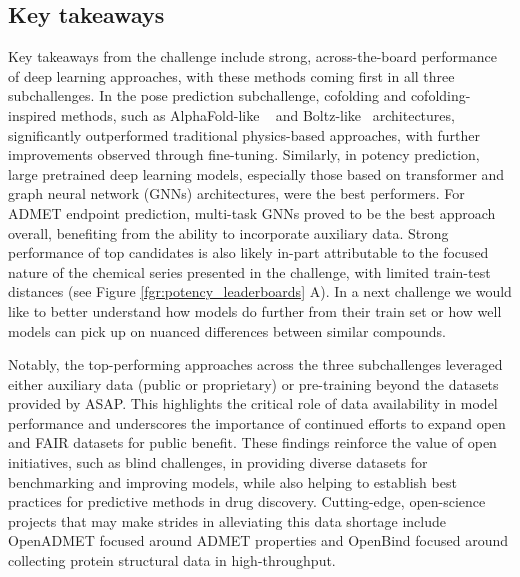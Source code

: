 \documentclass[journal=jcim,manuscript=article]{achemso}
\begin{document}
\subsection{Key takeaways}

Key takeaways from the challenge include strong, across-the-board performance of deep learning approaches, with these methods coming first in all three subchallenges. In the pose prediction subchallenge, cofolding and cofolding-inspired methods, such as AlphaFold-like ~\cite{abramson_2024_alphafold} and Boltz-like~\cite{wohlwend_2024_boltz-1, passaro_2025_boltz-2} architectures, significantly outperformed traditional physics-based approaches, with further improvements observed through fine-tuning. Similarly, in potency prediction, large pretrained deep learning models, especially those based on transformer and graph neural network (GNNs) architectures, were the best performers. For ADMET endpoint prediction, multi-task GNNs proved to be the best approach overall, benefiting from the ability to incorporate auxiliary data. Strong performance of top candidates is also likely in-part attributable to the focused nature of the chemical series presented in the challenge, with limited train-test distances (see Figure \ref{fgr:potency_leaderboards} A). In a next challenge we would like to better understand how models do further from their train set or how well models can pick up on nuanced differences between similar compounds.

Notably, the top-performing approaches across the three subchallenges leveraged either auxiliary data (public or proprietary) or pre-training beyond the datasets provided by ASAP. This highlights the critical role of data availability in model performance and underscores the importance of continued efforts to expand open and FAIR\cite{wilkinson_fair_2016} datasets for public benefit. These findings reinforce the value of open initiatives, such as blind challenges, in providing diverse datasets for benchmarking and improving models, while also helping to establish best practices for predictive methods in drug discovery. Cutting-edge, open-science projects that may make strides in alleviating this data shortage include OpenADMET\cite{openadmet_2025} focused around ADMET properties and OpenBind\cite{openbind_2025} focused around collecting protein structural data in high-throughput.
\end{document}
